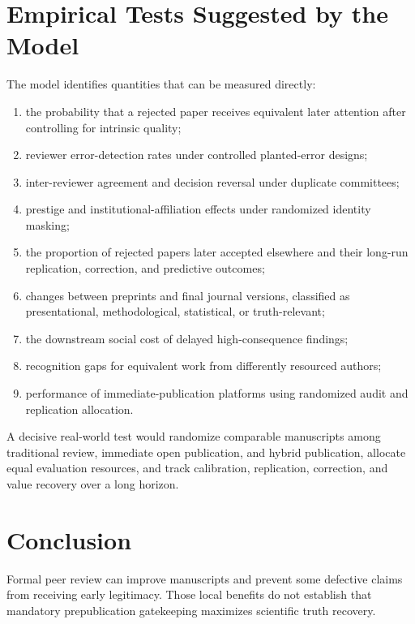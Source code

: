 \documentclass[11pt]{article}
\begin{document}
\section{Empirical Tests Suggested by the Model}

The model identifies quantities that can be measured directly:

\begin{enumerate}
    \item the probability that a rejected paper receives equivalent later attention after controlling for intrinsic quality;
    \item reviewer error-detection rates under controlled planted-error designs;
    \item inter-reviewer agreement and decision reversal under duplicate committees;
    \item prestige and institutional-affiliation effects under randomized identity masking;
    \item the proportion of rejected papers later accepted elsewhere and their long-run replication, correction, and predictive outcomes;
    \item changes between preprints and final journal versions, classified as presentational, methodological, statistical, or truth-relevant;
    \item the downstream social cost of delayed high-consequence findings;
    \item recognition gaps for equivalent work from differently resourced authors;
    \item performance of immediate-publication platforms using randomized audit and replication allocation.
\end{enumerate}

A decisive real-world test would randomize comparable manuscripts among traditional review, immediate open publication, and hybrid publication, allocate equal evaluation resources, and track calibration, replication, correction, and value recovery over a long horizon.

\section{Conclusion}

Formal peer review can improve manuscripts and prevent some defective claims from receiving early legitimacy. Those local benefits do not establish that mandatory prepublication gatekeeping maximizes scientific truth recovery.
\end{document}

